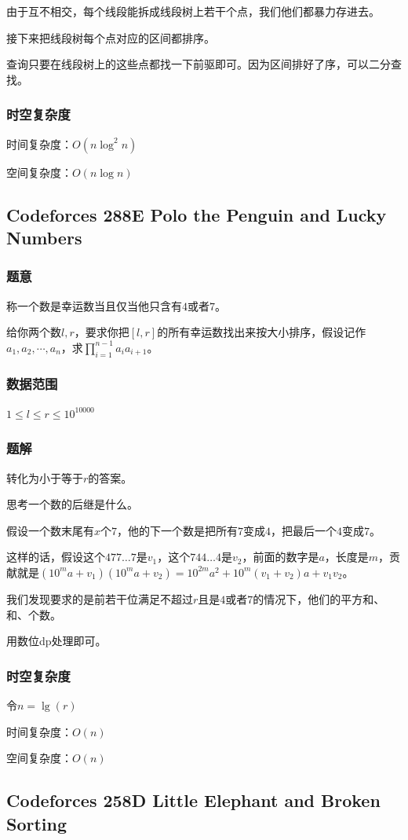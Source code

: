 \documentclass{ctexart}
\begin{document}
由于互不相交，每个线段能拆成线段树上若干个点，我们他们都暴力存进去。

接下来把线段树每个点对应的区间都排序。

查询只要在线段树上的这些点都找一下前驱即可。因为区间排好了序，可以二分查找。
\subsubsection{时空复杂度}
时间复杂度：$O(n \log^2 n)$

空间复杂度：$O(n \log n)$
\subsection{Codeforces 288E Polo the Penguin and Lucky Numbers}
\subsubsection{题意}
称一个数是幸运数当且仅当他只含有$4$或者$7$。

给你两个数$l,r$，要求你把$[l,r]$的所有幸运数找出来按大小排序，假设记作$a_1,a_2,\cdots,a_n$，求$\prod\limits_{i=1}^{n-1} a_ia_{i+1}$。
\subsubsection{数据范围}
$1 \le l \le r \le 10^{10000}$
\subsubsection{题解}
转化为小于等于$r$的答案。

思考一个数的后继是什么。

假设一个数末尾有$x$个$7$，他的下一个数是把所有$7$变成$4$，把最后一个$4$变成$7$。

这样的话，假设这个$477\ldots 7$是$v_1$，这个$744\ldots 4$是$v_2$，前面的数字是$a$，长度是$m$，贡献就是$(10^ma+v_1)(10^ma+v_2)=10^{2m}a^2+10^m(v_1+v_2)a+v_1v_2$。

我们发现要求的是前若干位满足不超过$r$且是$4$或者$7$的情况下，他们的平方和、和、个数。

用数位dp处理即可。
\subsubsection{时空复杂度}
令$n=\lg(r)$

时间复杂度：$O(n)$

空间复杂度：$O(n)$
\subsection{Codeforces 258D Little Elephant and Broken Sorting}
\end{document}
